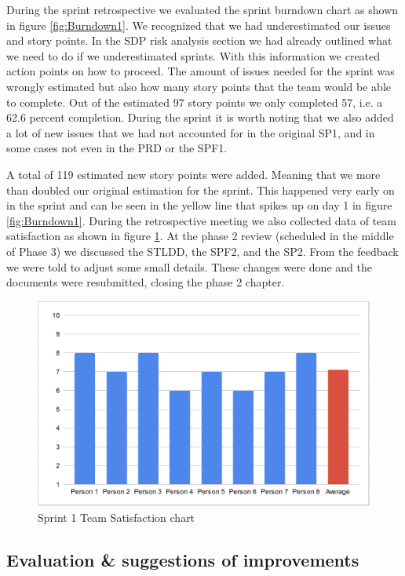 \documentclass{article}
\begin{document}
During the sprint retrospective we evaluated the sprint burndown chart as shown in figure \ref{fig:Burndown1}. We recognized that we had underestimated our issues and story points. In the SDP risk analysis section we had already outlined what we need to do if we underestimated sprints. With this information we created action points on how to proceed. The amount of issues needed for the sprint was wrongly estimated but also how many story points that the team would be able to complete.  Out of the estimated 97 story points we only completed 57, i.e. a 62.6 percent completion. During the sprint it is worth noting that we also added a lot of new issues that we had not accounted for in the original SP1, and in some cases not even in the PRD or the SPF1. 

A total of 119 estimated new story points were added. Meaning that we more than doubled our original estimation for the sprint. This happened very early on in the sprint and can be seen in the yellow line that spikes up on day 1 in figure \ref{fig:Burndown1}. During the retrospective meeting we also collected data of team satisfaction as shown in figure \ref{fig:Satisfaction1}. At the phase 2 review (scheduled in the middle of Phase 3) we discussed the STLDD, the SPF2, and the SP2. From the feedback we were told to adjust some small details. These changes were done and the documents were resubmitted, closing the phase 2 chapter.  

\begin{figure}[h!]
    \centering
    \includegraphics[scale=0.6]{pfrFigures/TeamSatisfaction1.png}
    \caption{Sprint 1 Team Satisfaction chart}
    \label{fig:Satisfaction1}
\end{figure}

\subsection{Evaluation \& suggestions of improvements}
\end{document}
